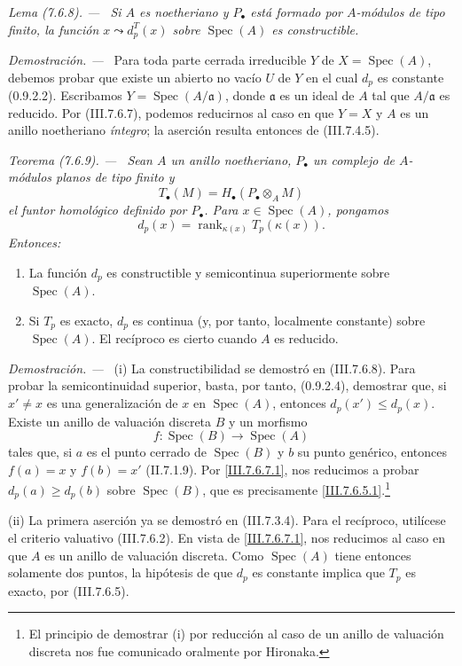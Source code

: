 \documentclass[10pt,oneside]{book}
\newcommand{\kres}{\kappa}
\newcommand{\Spec}{\operatorname{Spec}}
\newcommand{\sref}[2][]{\textup{(#2)}}
\newenvironment{theorem}[1][]{\par\medskip\noindent\itshape Teorema (#1). ---\ }{\par}
\newenvironment{lemma}[1][]{\par\medskip\noindent\itshape Lema (#1). ---\ }{\par}
\newenvironment{proof}{\par\medskip\noindent\textit{Demostración. ---\ }}{\par}
\begin{document}
\begin{lemma}[7.6.8]
\label{III.7.6.8}
Si $A$ es noetheriano y $P_\bullet$ está formado por $A$-módulos de
tipo finito, la función $x\leadsto d_p^T(x)$ sobre $\Spec(A)$ es
constructible.
\end{lemma}

\begin{proof}
Para toda parte cerrada irreducible $Y$ de $X=\Spec(A)$, debemos
probar que existe un abierto no vacío $U$ de $Y$ en el cual $d_p$ es
constante \sref[0]{0.9.2.2}. Escribamos
$Y=\Spec(A/\mathfrak a)$, donde $\mathfrak a$ es un ideal de $A$ tal
que $A/\mathfrak a$ es reducido. Por \sref{III.7.6.7}, podemos
reducirnos al caso en que $Y=X$ y $A$ es un anillo noetheriano
\emph{íntegro}; la aserción resulta entonces de \sref{III.7.4.5}.
\end{proof}

\begin{theorem}[7.6.9]
\label{III.7.6.9}
Sean $A$ un anillo noetheriano, $P_\bullet$ un complejo de
$A$-módulos planos de tipo finito y
\[
  T_\bullet(M)=H_\bullet(P_\bullet\otimes_A M)
\]
el funtor homológico definido por $P_\bullet$. Para
$x\in\Spec(A)$, pongamos
\[
  d_p(x)=\operatorname{rank}_{\kres(x)}T_p(\kres(x)).
\]
Entonces:
\begin{enumerate}
  \item[\textup{(i)}] La función $d_p$ es constructible y semicontinua
    superiormente sobre $\Spec(A)$.
  \item[\textup{(ii)}] Si $T_p$ es exacto, $d_p$ es continua (y, por tanto,
    localmente constante) sobre $\Spec(A)$. El recíproco es cierto
    cuando $A$ es reducido.
\end{enumerate}
\end{theorem}

\begin{proof}
\textnormal{(i)}
La constructibilidad se demostró en \sref{III.7.6.8}. Para probar la
semicontinuidad superior, basta, por tanto, \sref[0]{0.9.2.4},
demostrar que, si $x'\neq x$ es una generalización de $x$ en
$\Spec(A)$, entonces $d_p(x')\leq d_p(x)$. Existe un anillo de
valuación discreta $B$ y un morfismo
\[
  f:\Spec(B)\longrightarrow\Spec(A)
\]
tales que, si $a$ es el punto cerrado de $\Spec(B)$ y $b$ su punto
genérico, entonces $f(a)=x$ y $f(b)=x'$
\sref[II]{II.7.1.9}. Por \eqref{III.7.6.7.1}, nos reducimos a probar
$d_p(a)\geq d_p(b)$ sobre $\Spec(B)$, que es precisamente
\eqref{III.7.6.5.1}.\footnote{El principio de demostrar
\textnormal{(i)} por reducción al caso de un anillo de valuación
discreta nos fue comunicado oralmente por Hironaka.}

\medskip
\textnormal{(ii)}
La primera aserción ya se demostró en \sref{III.7.3.4}. Para el
recíproco, utilícese el criterio valuativo \sref{III.7.6.2}. En vista
de \eqref{III.7.6.7.1}, nos reducimos al caso en que $A$ es un anillo
de valuación discreta. Como $\Spec(A)$ tiene entonces solamente dos
puntos, la hipótesis de que $d_p$ es constante implica que $T_p$ es
exacto, por \sref{III.7.6.5}.
\end{proof}
\end{document}
